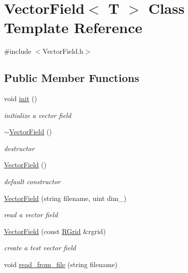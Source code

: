 \hypertarget{class_vector_field}{}\section{Vector\+Field$<$ T $>$ Class Template Reference}
\label{class_vector_field}


{\ttfamily \#include $<$Vector\+Field.\+h$>$}

\subsection*{Public Member Functions}
\begin{DoxyCompactItemize}
\item 
void \hyperlink{class_vector_field_a72a70495c8263f0f35246290f250efce}{init} ()
\begin{DoxyCompactList}\small\item\em initialize a vector field \end{DoxyCompactList}\item 
\hyperlink{class_vector_field_ad3c8e719037c40a4122fad0911ae13c1}{$\sim$\+Vector\+Field} ()
\begin{DoxyCompactList}\small\item\em destructor \end{DoxyCompactList}\item 
\hyperlink{class_vector_field_ad5ee5620f8b01cbf0d7faaf15d7d07c6}{Vector\+Field} ()
\begin{DoxyCompactList}\small\item\em default constructor \end{DoxyCompactList}\item 
\hyperlink{class_vector_field_a16fa16212675ff13648096b33af955b2}{Vector\+Field} (string filename, uint dim\+\_\+)
\begin{DoxyCompactList}\small\item\em read a vector field \end{DoxyCompactList}\item 
\hyperlink{class_vector_field_aedfb7f4fc915b8897e928be65aad4696}{Vector\+Field} (const \hyperlink{struct_r_grid}{R\+Grid} \&rgrid)
\begin{DoxyCompactList}\small\item\em create a test vector field \end{DoxyCompactList}\item 
void \hyperlink{class_vector_field_a5c4bde5b0ee1ac3400029bcf165a577c}{read\+\_\+from\+\_\+file} (string filename)

\end{DoxyCompactItemize}
